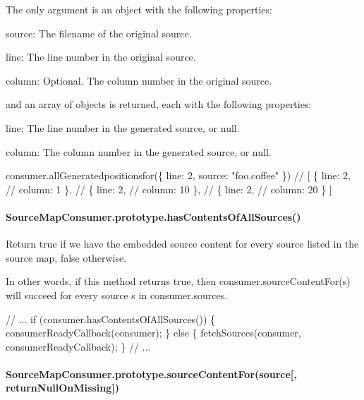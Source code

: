 The only argument is an object with the following properties\+:


\begin{DoxyItemize}
\item {\ttfamily source}\+: The filename of the original source.
\item {\ttfamily line}\+: The line number in the original source.
\item {\ttfamily column}\+: Optional. The column number in the original source.
\end{DoxyItemize}

and an array of objects is returned, each with the following properties\+:


\begin{DoxyItemize}
\item {\ttfamily line}\+: The line number in the generated source, or null.
\item {\ttfamily column}\+: The column number in the generated source, or null.
\end{DoxyItemize}


\begin{DoxyCode}
consumer.allGeneratedpositionsfor(\{ line: 2, source: "foo.coffee" \})
// [ \{ line: 2,
//     column: 1 \},
//   \{ line: 2,
//     column: 10 \},
//   \{ line: 2,
//     column: 20 \} ]
\end{DoxyCode}


\paragraph*{Source\+Map\+Consumer.\+prototype.\+has\+Contents\+Of\+All\+Sources()}

Return true if we have the embedded source content for every source listed in the source map, false otherwise.

In other words, if this method returns {\ttfamily true}, then {\ttfamily consumer.\+source\+Content\+For(s)} will succeed for every source {\ttfamily s} in {\ttfamily consumer.\+sources}.


\begin{DoxyCode}
// ...
if (consumer.hasContentsOfAllSources()) \{
  consumerReadyCallback(consumer);
\} else \{
  fetchSources(consumer, consumerReadyCallback);
\}
// ...
\end{DoxyCode}


\paragraph*{Source\+Map\+Consumer.\+prototype.\+source\+Content\+For(source\mbox{[}, return\+Null\+On\+Missing\mbox{]})}

